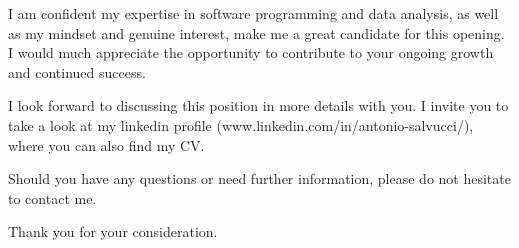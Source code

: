 \documentclass[11pt, a4paper]{\TEXPATH awesome-cv}
\begin{document}
\begin{cvletter}
  I am confident my expertise in software programming and data analysis, as
  well as my mindset and genuine interest, make me a great candidate for this
  opening. I would much appreciate the opportunity to contribute to your
  ongoing growth and continued success.

  I look forward to discussing this position in more details with you.
  I invite you to take a look at my linkedin profile
  (www.linkedin.com/in/antonio-salvucci/), where you can also find my CV.
   
  Should you have any questions or need further information, please do not
  hesitate to contact me.

  Thank you for your consideration.
  
\end{cvletter}
 

\makeletterclosing %
\end{document}
